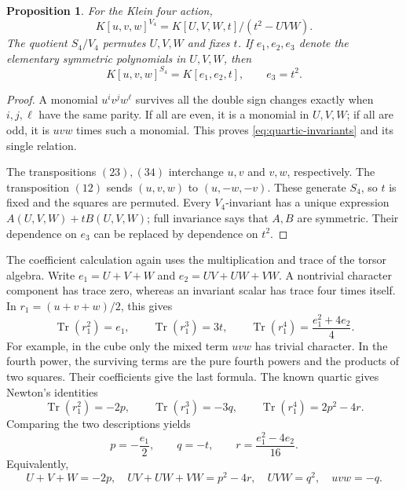 \documentclass[11pt]{article}
\newtheorem{proposition}{Proposition}[section]
\theoremstyle{remark}
\begin{document}
\begin{proposition}
For the Klein four action,
\begin{equation}
K[u,v,w]^{V_4}=K[U,V,W,t]/(t^2-UVW).
\label{eq:quartic-invariants}
\end{equation}
The quotient \(S_4/V_4\) permutes \(U,V,W\) and fixes \(t\). If \(e_1,e_2,e_3\) denote the elementary symmetric polynomials in \(U,V,W\), then
\begin{equation}
K[u,v,w]^{S_4}=K[e_1,e_2,t],\qquad e_3=t^2.
\label{eq:quartic-full-invariants}
\end{equation}
\end{proposition}

\begin{proof}
A monomial \(u^iv^jw^\ell\) survives all the double sign changes exactly when \(i,j,\ell\) have the same parity. If all are even, it is a monomial in \(U,V,W\); if all are odd, it is \(uvw\) times such a monomial. This proves \eqref{eq:quartic-invariants} and its single relation.

The transpositions \((23),(34)\) interchange \(u,v\) and \(v,w\), respectively. The transposition \((12)\) sends \((u,v,w)\) to \((u,-w,-v)\). These generate \(S_4\), so \(t\) is fixed and the squares are permuted. Every \(V_4\)-invariant has a unique expression \(A(U,V,W)+tB(U,V,W)\); full invariance says that \(A,B\) are symmetric. Their dependence on \(e_3\) can be replaced by dependence on \(t^2\).
\end{proof}

The coefficient calculation again uses the multiplication and trace of the torsor algebra. Write \(e_1=U+V+W\) and \(e_2=UV+UW+VW\). A nontrivial character component has trace zero, whereas an invariant scalar has trace four times itself. In \(r_1=(u+v+w)/2\), this gives
\[
\operatorname{Tr}(r_1^2)=e_1,\qquad
\operatorname{Tr}(r_1^3)=3t,\qquad
\operatorname{Tr}(r_1^4)=\frac{e_1^2+4e_2}{4}.
\]
For example, in the cube only the mixed term \(uvw\) has trivial character. In the fourth power, the surviving terms are the pure fourth powers and the products of two squares. Their coefficients give the last formula. The known quartic gives Newton's identities
\[
\operatorname{Tr}(r_1^2)=-2p,\qquad
\operatorname{Tr}(r_1^3)=-3q,\qquad
\operatorname{Tr}(r_1^4)=2p^2-4r.
\]
Comparing the two descriptions yields
\begin{equation}
p=-\frac{e_1}{2},\qquad q=-t,\qquad
r=\frac{e_1^2-4e_2}{16}.
\label{eq:quartic-coefficients}
\end{equation}
Equivalently,
\begin{equation}
U+V+W=-2p,\quad UV+UW+VW=p^2-4r,\quad UVW=q^2,
\quad uvw=-q.
\label{eq:quartic-constraints}
\end{equation}
\end{document}
